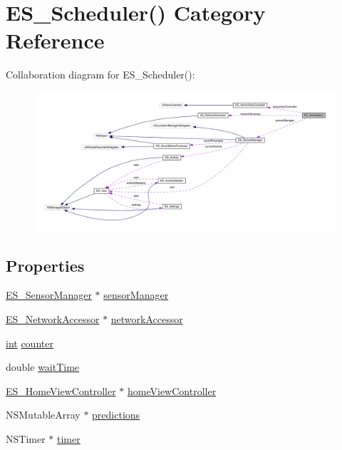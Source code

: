 \hypertarget{category_e_s___scheduler_07_08}{\section{E\+S\+\_\+\+Scheduler() Category Reference}
\label{category_e_s___scheduler_07_08}
}


Collaboration diagram for E\+S\+\_\+\+Scheduler()\+:\nopagebreak
\begin{figure}[H]
\begin{center}
\leavevmode
\includegraphics[width=350pt]{db/d07/category_e_s___scheduler_07_08__coll__graph}
\end{center}
\end{figure}
\subsection*{Properties}
\begin{DoxyCompactItemize}
\item 
\hyperlink{interface_e_s___sensor_manager}{E\+S\+\_\+\+Sensor\+Manager} $\ast$ \hyperlink{category_e_s___scheduler_07_08_a69f8cef7fe4de84d48f2ce16e966d81b}{sensor\+Manager}
\item 
\hyperlink{interface_e_s___network_accessor}{E\+S\+\_\+\+Network\+Accessor} $\ast$ \hyperlink{category_e_s___scheduler_07_08_a00b193160f77cbff712bc6afa3aba894}{network\+Accessor}
\item 
\hyperlink{ioapi_8h_a787fa3cf048117ba7123753c1e74fcd6}{int} \hyperlink{category_e_s___scheduler_07_08_a2c53e7d223551dba41715efa46826b2b}{counter}
\item 
double \hyperlink{category_e_s___scheduler_07_08_a0e5712f2970e9c2bd775c8c9dd83a106}{wait\+Time}
\item 
\hyperlink{interface_e_s___home_view_controller}{E\+S\+\_\+\+Home\+View\+Controller} $\ast$ \hyperlink{category_e_s___scheduler_07_08_a43e8d9d72ef504ba23c073597012ff3f}{home\+View\+Controller}
\item 
N\+S\+Mutable\+Array $\ast$ \hyperlink{category_e_s___scheduler_07_08_a3ade2070171412aa851e3628a09c7863}{predictions}
\item 
N\+S\+Timer $\ast$ \hyperlink{category_e_s___scheduler_07_08_ab57b08f10d38f20c8d4a15bffe23e001}{timer}
\end{DoxyCompactItemize}


